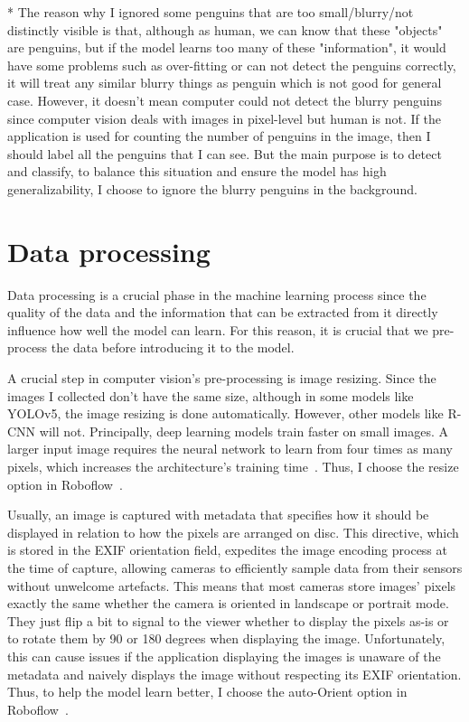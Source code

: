 \documentclass[runningheads]{llncs}
\begin{document}
* The reason why I ignored some penguins that are too small/blurry/not distinctly visible is that, although as human, we can know that these "objects" are penguins, but if the model learns too many of these "information", it would have some problems such as over-fitting or can not detect the penguins correctly, it will treat any similar blurry things as penguin which is not good for general case. However, it doesn't mean computer could not detect the blurry penguins since computer vision deals with images in pixel-level but human is not. If the application is used for counting the number of penguins in the image, then I should label all the penguins that I can see. But the main purpose is to detect and classify, to balance this situation and ensure the model has high generalizability, I choose to ignore the blurry penguins in the background.

\section{Data processing}
Data processing is a crucial phase in the machine learning process since the quality of the data and the information that can be extracted from it directly influence how well the model can learn. For this reason, it is crucial that we pre-process the data before introducing it to the model.

A crucial step in computer vision's pre-processing is image resizing. Since the images I collected don't have the same size, although in some models like YOLOv5, the image resizing is done automatically. However, other models like R-CNN will not. Principally, deep learning models train faster on small images. A larger input image requires the neural network to learn from four times as many pixels, which increases the architecture's training time~\cite{resize}. Thus, I choose the resize option in Roboflow~\cite{ref_roboflow}.

Usually, an image is captured with metadata that specifies how it should be displayed in relation to how the pixels are arranged on disc. This directive, which is stored in the EXIF orientation field, expedites the image encoding process at the time of capture, allowing cameras to efficiently sample data from their sensors without unwelcome artefacts. This means that most cameras store images' pixels exactly the same whether the camera is oriented in landscape or portrait mode. They just flip a bit to signal to the viewer whether to display the pixels as-is or to rotate them by 90 or 180 degrees when displaying the image. Unfortunately, this can cause issues if the application displaying the images is unaware of the metadata and naively displays the image without respecting its EXIF orientation. Thus, to help the model learn better, I choose the auto-Orient option in Roboflow~\cite{ref_roboflow}.
\end{document}
